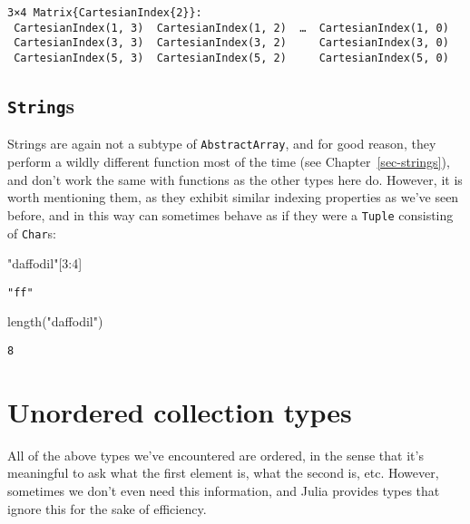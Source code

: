 \documentclass[
  letterpaper,
  DIV=11,
  numbers=noendperiod]{scrreprt}
\newenvironment{Shaded}{\begin{snugshade}}{\end{snugshade}}
\newcommand{\FloatTok}[1]{\textcolor[rgb]{0.68,0.00,0.00}{#1}}
\newcommand{\FunctionTok}[1]{\textcolor[rgb]{0.28,0.35,0.67}{#1}}
\newcommand{\NormalTok}[1]{\textcolor[rgb]{0.00,0.23,0.31}{#1}}
\newcommand{\OperatorTok}[1]{\textcolor[rgb]{0.37,0.37,0.37}{#1}}
\newcommand{\StringTok}[1]{\textcolor[rgb]{0.13,0.47,0.30}{#1}}
\begin{document}
\begin{verbatim}
3×4 Matrix{CartesianIndex{2}}:
 CartesianIndex(1, 3)  CartesianIndex(1, 2)  …  CartesianIndex(1, 0)
 CartesianIndex(3, 3)  CartesianIndex(3, 2)     CartesianIndex(3, 0)
 CartesianIndex(5, 3)  CartesianIndex(5, 2)     CartesianIndex(5, 0)
\end{verbatim}

\hypertarget{strings}{%
\subsection{\texorpdfstring{\texttt{String}s}{Strings}}\label{strings}}

Strings are again not a subtype of \texttt{AbstractArray}, and for good
reason, they perform a wildly different function most of the time (see
Chapter~\ref{sec-strings}), and don't work the same with functions as
the other types here do. However, it is worth mentioning them, as they
exhibit similar indexing properties as we've seen before, and in this
way can sometimes behave as if they were a \texttt{Tuple} consisting of
\texttt{Char}s:

\begin{Shaded}
\begin{Highlighting}[]
\StringTok{"daffodil"}\NormalTok{[}\FloatTok{3}\OperatorTok{:}\FloatTok{4}\NormalTok{]}
\end{Highlighting}
\end{Shaded}

\begin{verbatim}
"ff"
\end{verbatim}

\begin{Shaded}
\begin{Highlighting}[]
\FunctionTok{length}\NormalTok{(}\StringTok{"daffodil"}\NormalTok{)}
\end{Highlighting}
\end{Shaded}

\begin{verbatim}
8
\end{verbatim}

\hypertarget{unordered-collection-types}{%
\section{Unordered collection types}\label{unordered-collection-types}}

All of the above types we've encountered are ordered, in the sense that
it's meaningful to ask what the first element is, what the second is,
etc. However, sometimes we don't even need this information, and Julia
provides types that ignore this for the sake of efficiency.
\end{document}
